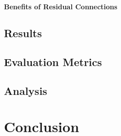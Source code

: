 \documentclass[11pt]{article}
\begin{document}
\textbf{Benefits of Residual Connections}

\subsection{Results}

\subsection{Evaluation Metrics}

\subsection{Analysis}


\newpage{}

\section{Conclusion}




\newpage{}



\end{document}
